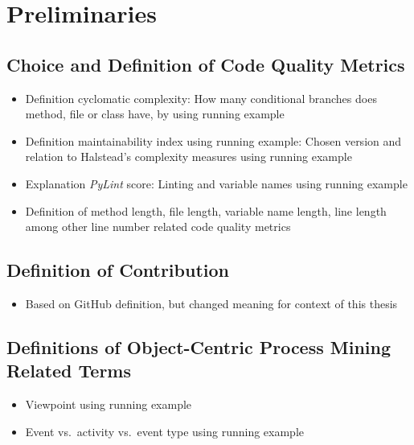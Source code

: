 \chapter{Preliminaries}
\label{chap:prelim}

\section{Choice and Definition of Code Quality Metrics}
\begin{itemize}
	\item Definition cyclomatic complexity: How many conditional branches does method, file or class have, by using running example
	\item Definition maintainability index using running example: Chosen version and relation to Halstead's complexity measures using running example
	\item Explanation \emph{PyLint} score: Linting and variable names using running example
	\item Definition of method length, file length, variable name length, line length among other line number related code quality metrics
\end{itemize}

\section{Definition of Contribution}
\begin{itemize}
	\item Based on GitHub definition, but changed meaning for context of this thesis
\end{itemize}

\section{Definitions of Object-Centric Process Mining Related Terms}
\begin{itemize}
	\item Viewpoint using running example
	\item Event vs.\ activity vs.\ event type using running example
\end{itemize}
